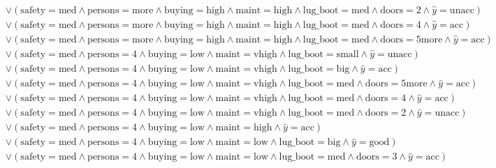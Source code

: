 \begin{scriptsize}
\[\begin{aligned}
  \\ & \lor (\text{safety}=\text{med} \land \text{persons}=\text{more} \land \text{buying}=\text{high} \land \text{maint}=\text{high} \land \text{lug_boot}=\text{med} \land \text{doors}=\text{2} \land \hat{y}=\text{unacc})
  \\ & \lor (\text{safety}=\text{med} \land \text{persons}=\text{more} \land \text{buying}=\text{high} \land \text{maint}=\text{high} \land \text{lug_boot}=\text{med} \land \text{doors}=\text{4} \land \hat{y}=\text{acc})
  \\ & \lor (\text{safety}=\text{med} \land \text{persons}=\text{more} \land \text{buying}=\text{high} \land \text{maint}=\text{high} \land \text{lug_boot}=\text{med} \land \text{doors}=\text{5more} \land \hat{y}=\text{acc})
  \\ & \lor (\text{safety}=\text{med} \land \text{persons}=\text{4} \land \text{buying}=\text{low} \land \text{maint}=\text{vhigh} \land \text{lug_boot}=\text{small} \land \hat{y}=\text{unacc})
  \\ & \lor (\text{safety}=\text{med} \land \text{persons}=\text{4} \land \text{buying}=\text{low} \land \text{maint}=\text{vhigh} \land \text{lug_boot}=\text{big} \land \hat{y}=\text{acc})
  \\ & \lor (\text{safety}=\text{med} \land \text{persons}=\text{4} \land \text{buying}=\text{low} \land \text{maint}=\text{vhigh} \land \text{lug_boot}=\text{med} \land \text{doors}=\text{5more} \land \hat{y}=\text{acc})
  \\ & \lor (\text{safety}=\text{med} \land \text{persons}=\text{4} \land \text{buying}=\text{low} \land \text{maint}=\text{vhigh} \land \text{lug_boot}=\text{med} \land \text{doors}=\text{4} \land \hat{y}=\text{acc})
  \\ & \lor (\text{safety}=\text{med} \land \text{persons}=\text{4} \land \text{buying}=\text{low} \land \text{maint}=\text{vhigh} \land \text{lug_boot}=\text{med} \land \text{doors}=\text{2} \land \hat{y}=\text{unacc})
  \\ & \lor (\text{safety}=\text{med} \land \text{persons}=\text{4} \land \text{buying}=\text{low} \land \text{maint}=\text{high} \land \hat{y}=\text{acc})
  \\ & \lor (\text{safety}=\text{med} \land \text{persons}=\text{4} \land \text{buying}=\text{low} \land \text{maint}=\text{low} \land \text{lug_boot}=\text{big} \land \hat{y}=\text{good})
  \\ & \lor (\text{safety}=\text{med} \land \text{persons}=\text{4} \land \text{buying}=\text{low} \land \text{maint}=\text{low} \land \text{lug_boot}=\text{med} \land \text{doors}=\text{3} \land \hat{y}=\text{acc})

\end{aligned}\]
\end{scriptsize}
